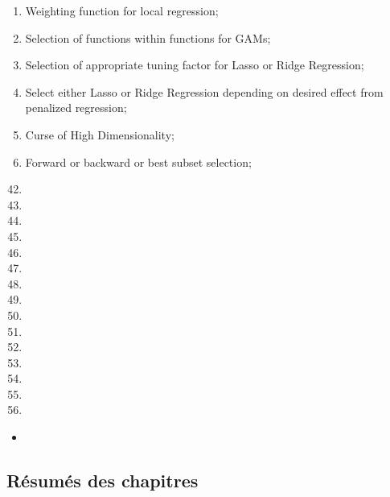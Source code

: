 \begin{outcomes}
\begin{enumerate}
\begin{knowledge}
\begin{enumerate}[label = \alph*.]
		\item	Weighting function for local regression;
		\item	Selection of functions within functions for GAMs;
		\item	Selection of appropriate tuning factor for Lasso or Ridge Regression;
		\item	Select either Lasso or Ridge Regression depending on desired effect from penalized regression;
		\item	Curse of High Dimensionality;
		\item	Forward or backward or best subset selection;
	\end{enumerate}
	\end{knowledge}
\end{enumerate}
\end{outcomes}

\begin{ASM_chapter}
\begin{enumerate}
  \setcounter{enumi}{41}
	\item	{}
	\item	{}
	\item	{}
	\item	{}
	\item	{}
	\item	{}
	\item	{}
	\item	{}
	\item	{}
	\item	{}
	\item	{}
	\item	{}
	\item	{}
	\item	{}
	\item	{}
\end{enumerate}
\end{ASM_chapter}

\begin{YTB_vids}
\begin{itemize}
	\item	
\end{itemize}
\end{YTB_vids}

\subsection{Résumés des chapitres}

